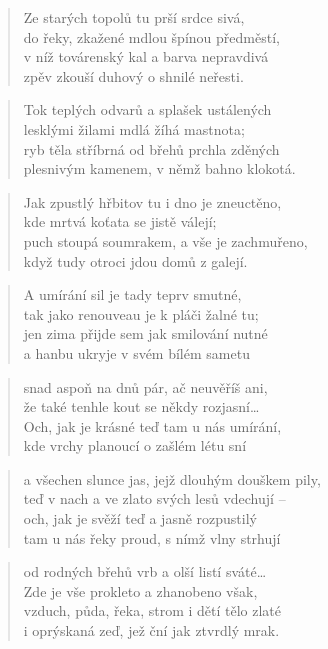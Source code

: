 \documentclass{book}
\begin{document}
\newpage
{}
\begin{verse}
Ze starých topolů tu prší srdce sivá,\\
do řeky, zkažené mdlou špínou předměstí,\\
v níž továrenský kal a barva nepravdivá\\
zpěv zkouší duhový o shnilé neřesti.
\end{verse}
\begin{verse}
Tok teplých odvarů a splašek ustálených\\
lesklými žilami mdlá žíhá mastnota;\\
ryb těla stříbrná od břehů prchla zděných\\
plesnivým kamenem, v němž bahno klokotá.
\end{verse}
\begin{verse}
Jak zpustlý hřbitov tu i dno je zneuctěno,\\
kde mrtvá koťata se jistě válejí;\\
puch stoupá soumrakem, a vše je zachmuřeno,\\
když tudy otroci jdou domů z galejí.
\end{verse}
\begin{verse}
A umírání sil je tady teprv smutné,\\
tak jako renouveau je k pláči žalné tu;\\
jen zima přijde sem jak smilování nutné\\
a hanbu ukryje v svém bílém sametu
\end{verse}
\begin{verse}
snad aspoň na dnů pár, ač neuvěříš ani,\\
že také tenhle kout se někdy rozjasní\ldots\\
Och, jak je krásné teď tam u nás umírání,\\
kde vrchy planoucí o zašlém létu sní
\end{verse}
\begin{verse}
a všechen slunce jas, jejž dlouhým douškem pily,\\
teď v nach a ve zlato svých lesů vdechují -- \\
och, jak je svěží teď a jasně rozpustilý\\
tam u nás řeky proud, s nímž vlny strhují
\end{verse}
\begin{verse}
od rodných břehů vrb a olší listí sváté\ldots\\
Zde je vše prokleto a zhanobeno však,\\
vzduch, půda, řeka, strom i dětí tělo zlaté\\
i oprýskaná zeď, jež ční jak ztvrdlý mrak.
\end{verse}
\end{document}
